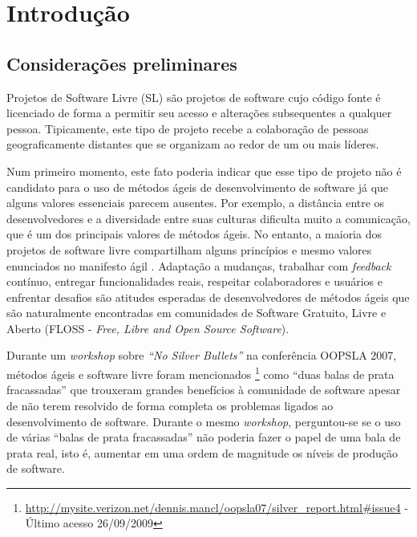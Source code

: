 \chapter{Introdução}
\label{cap:introducao}

\section{Considerações preliminares}
\label{sec:consideracoes_preliminares}

Projetos de Software Livre (SL) são projetos de software cujo código
fonte é licenciado de forma a permitir seu acesso e alterações
subsequentes a qualquer pessoa. Tipicamente, este tipo de projeto
recebe a colaboração de pessoas geograficamente distantes
\cite{Dempsey1999} que se organizam ao redor de um ou mais líderes.

Num primeiro momento, este fato poderia indicar que esse tipo de
projeto não é candidato para o uso de métodos ágeis de desenvolvimento
de software já que alguns valores essenciais parecem ausentes. Por
exemplo, a distância entre os desenvolvedores e a diversidade entre
suas culturas dificulta muito a comunicação, que é um dos principais
valores de métodos ágeis. No entanto, a maioria dos projetos de
software livre compartilham alguns princípios e mesmo valores
enunciados no manifesto ágil \cite{AgileManifesto}. Adaptação a
mudanças, trabalhar com \emph{feedback} contínuo, entregar
funcionalidades reais, respeitar colaboradores e usuários e enfrentar
desafios são atitudes esperadas de desenvolvedores de métodos ágeis
que são naturalmente encontradas em comunidades de Software Gratuito,
Livre e Aberto (FLOSS - \emph{Free, Libre and Open Source Software}).

Durante um \emph{workshop} \cite{OOPSLA07} sobre \emph{``No Silver
  Bullets''} \cite{Brooks1987} na conferência OOPSLA 2007, métodos
ágeis e software livre foram mencionados
\footnote{\url{http://mysite.verizon.net/dennis.mancl/oopsla07/silver_report.html\#issue4}
  - Último acesso 26/09/2009} como ``duas balas de prata fracassadas''
que trouxeram grandes benefícios à comunidade de software apesar de
não terem resolvido de forma completa os problemas ligados ao
desenvolvimento de software. Durante o mesmo \emph{workshop},
perguntou-se se o uso de várias ``balas de prata fracassadas'' não
poderia fazer o papel de uma bala de prata real, isto é, aumentar em
uma ordem de magnitude os níveis de produção de software.

